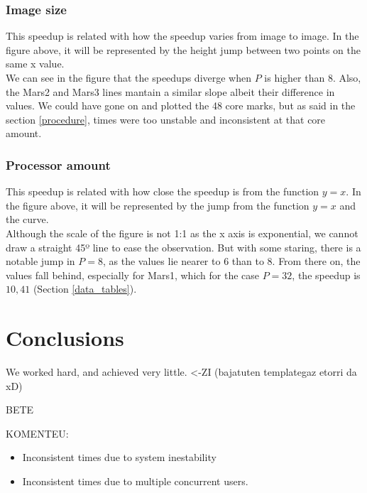 \documentclass[12pt]{article}
\begin{document}
\subsubsection{Image size}
This speedup is related with how the speedup varies from image to image. In the figure above, it will be represented by the height jump between two points on the same x value.\\

We can see in the figure that the speedups diverge when $P$ is higher than 8. Also, the Mars2 and Mars3 lines mantain a similar slope albeit their difference in values. We could have gone on and plotted the 48 core marks, but as said in the section \ref{procedure}, times were too unstable and inconsistent at that core amount.

\subsubsection{Processor amount}
This speedup is related with how close the speedup is from the function $y=x$. In the figure above, it will be represented by the jump from the function $y=x$ and the curve.\\

Although the scale of the figure is not 1:1 as the x axis is exponential, we cannot draw a straight 45º line to ease the observation. But with some staring, there is a notable jump in $P=8$, as the values lie nearer to $6$ than to $8$. From there on, the values fall behind, especially for Mars1, which for the case $P=32$, the speedup is $10,41$ (Section \ref{data_tables}).

\section{Conclusions}\label{conclusions}
We worked hard, and achieved very little. <-ZI	(bajatuten templategaz etorri da xD)


BETE

	KOMENTEU:
\begin{itemize}
	\item Inconsistent times due to system inestability
	\item Inconsistent times due to multiple concurrent users.

\end{itemize}



\end{document}
